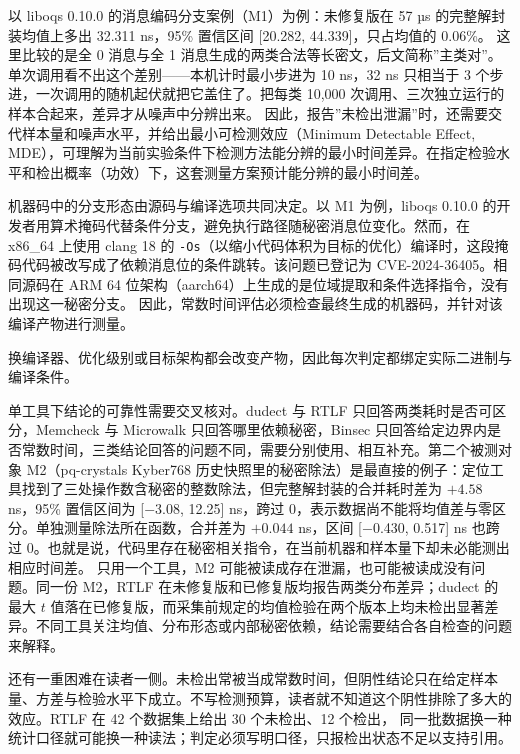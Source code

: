 以 liboqs 0.10.0 的消息编码分支案例（M1）为例：未修复版在 57 µs 的完整解封装均值上多出 32.311 ns，95\% 置信区间 [20.282, 44.339]，只占均值的 0.06\%。%
这里比较的是全 0 消息与全 1 消息生成的两类合法等长密文，后文简称”主类对”。单次调用看不出这个差别——本机计时最小步进为 10 ns，32 ns 只相当于 3 个步进，一次调用的随机起伏就把它盖住了。把每类 10,000 次调用、三次独立运行的样本合起来，差异才从噪声中分辨出来。%
因此，报告”未检出泄漏”时，还需要交代样本量和噪声水平，并给出最小可检测效应（Minimum Detectable Effect, MDE），可理解为当前实验条件下检测方法能分辨的最小时间差异。在指定检验水平和检出概率（功效）下，这套测量方案预计能分辨的最小时间差。

机器码中的分支形态由源码与编译选项共同决定。以 M1 为例，liboqs 0.10.0 的开发者用算术掩码代替条件分支，避免执行路径随秘密消息位变化。然而，在 x86\_64 上使用 clang 18 的 \texttt{-Os}（以缩小代码体积为目标的优化）编译时，这段掩码代码被改写成了依赖消息位的条件跳转。该问题已登记为 CVE-2024-36405\cite{ghsa-f2v9}。相同源码在 ARM 64 位架构（aarch64）上生成的是位域提取和条件选择指令，没有出现这一秘密分支。%
因此，常数时间评估必须检查最终生成的机器码，并针对该编译产物进行测量。

换编译器、优化级别或目标架构都会改变产物，因此每次判定都绑定实际二进制与编译条件。

单工具下结论的可靠性需要交叉核对。dudect 与 RTLF 只回答两类耗时是否可区分\cite{dudect,rtlf}，Memcheck 与 Microwalk 只回答哪里依赖秘密\cite{ctgrind,microwalk}，Binsec 只回答给定边界内是否常数时间\cite{binsec}，三类结论回答的问题不同，需要分别使用、相互补充。第二个被测对象 M2（pq-crystals Kyber768 历史快照里的秘密除法）是最直接的例子：定位工具找到了三处操作数含秘密的整数除法，但完整解封装的合并耗时差为 $+4.58$ ns，95\% 置信区间为 [$-$3.08, 12.25] ns，跨过 0，表示数据尚不能将均值差与零区分。单独测量除法所在函数，合并差为 $+0.044$ ns，区间 [$-$0.430, 0.517] ns 也跨过 0。也就是说，代码里存在秘密相关指令，在当前机器和样本量下却未必能测出相应时间差。%
只用一个工具，M2 可能被读成存在泄漏，也可能被读成没有问题。同一份 M2，RTLF 在未修复版和已修复版均报告两类分布差异；dudect 的最大 $t$ 值落在已修复版，而采集前规定的均值检验在两个版本上均未检出显著差异。不同工具关注均值、分布形态或内部秘密依赖，结论需要结合各自检查的问题来解释。

还有一重困难在读者一侧。未检出常被当成常数时间，但阴性结论只在给定样本量、方差与检验水平下成立。不写检测预算，读者就不知道这个阴性排除了多大的效应。RTLF 在 42 个数据集上给出 30 个未检出、12 个检出\cite{rtlf}，%
同一批数据换一种统计口径就可能换一种读法；判定必须写明口径，只报检出状态不足以支持引用。

